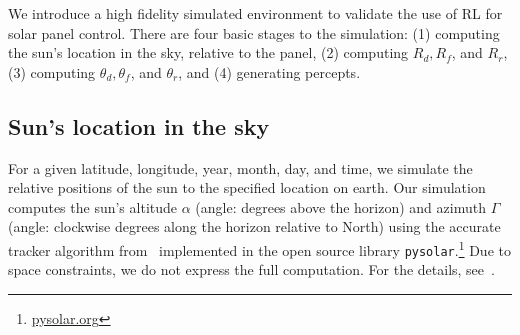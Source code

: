 \documentclass{article}
\begin{document}
We introduce a high fidelity simulated environment to validate the use of RL for solar panel control. There are four basic stages to the simulation: (1) computing the sun's location in the sky, relative to the panel, (2) computing $R_d, R_f$, and $R_r$, (3) computing $\theta_d, \theta_f$, and $\theta_r$, and (4) generating percepts.

\subsection{Sun's location in the sky}
For a given latitude, longitude, year, month, day, and time, we simulate the relative positions of the sun to the specified location on earth. Our simulation computes the sun's altitude $\alpha$ (angle: degrees above the horizon) and azimuth $\Gamma$ (angle: clockwise degrees along the horizon relative to North) using the accurate tracker algorithm from~\citet{reda2004solar} implemented in the open source library \texttt{pysolar}.\footnote{\url{pysolar.org}} Due to space constraints, we do not express the full computation. For the details, see~\citet{reda2004solar}.%


\end{document}

